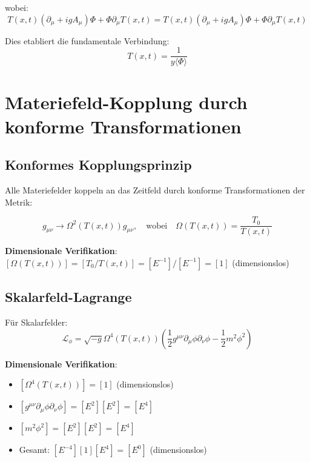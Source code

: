 \documentclass[12pt,a4paper]{article}
\newcommand{\Tfield}{T(x,t)}
\newcommand{\Tzero}{T_0}
\newcommand{\DhiggsT}{\Tfield (\partial_\mu + ig A_\mu) \Phi + \Phi \partial_\mu \Tfield}
\theoremstyle{definition}
\theoremstyle{remark}
\begin{document}
	wobei:
	\begin{equation}
		\DhiggsT = \Tfield (\partial_\mu + ig A_\mu) \Phi + \Phi \partial_\mu \Tfield
		\label{eq:higgs_verbindung}
	\end{equation}
	
	Dies etabliert die fundamentale Verbindung:
	\begin{equation}
		\Tfield = \frac{1}{y\langle\Phi\rangle}
		\label{eq:zeit_higgs_relation}
	\end{equation}
	
	\section{Materiefeld-Kopplung durch konforme Transformationen}
	\label{sec:materie_kopplung}
	
	\subsection{Konformes Kopplungsprinzip}
	\label{subsec:konformes_kopplungsprinzip}
	
	Alle Materiefelder koppeln an das Zeitfeld durch konforme Transformationen der Metrik:
	
	\begin{equation}
		g_{\mu\nu} \to \Omega^2(\Tfield) g_{\mu\nu}, \quad \text{wobei} \quad \Omega(\Tfield) = \frac{\Tzero}{\Tfield}
		\label{eq:konforme_transformation}
	\end{equation}
	
	\textbf{Dimensionale Verifikation}: $[\Omega(\Tfield)] = [\Tzero/\Tfield] = [E^{-1}]/[E^{-1}] = [1]$ (dimensionslos) \checkmark
	
	\subsection{Skalarfeld-Lagrange}
	\label{subsec:skalarfeld_lagrange}
	
	Für Skalarfelder:
	\begin{equation}
		\mathcal{L}_\phi = \sqrt{-g} \Omega^4(\Tfield) \left(\frac{1}{2} g^{\mu\nu} \partial_\mu \phi \partial_\nu \phi - \frac{1}{2} m^2 \phi^2\right)
		\label{eq:skalar_lagrange}
	\end{equation}
	
	\textbf{Dimensionale Verifikation}:
	\begin{itemize}
		\item $[\Omega^4(\Tfield)] = [1]$ (dimensionslos)
		\item $[g^{\mu\nu} \partial_\mu \phi \partial_\nu \phi] = [E^2][E^2] = [E^4]$
		\item $[m^2 \phi^2] = [E^2][E^2] = [E^4]$
		\item Gesamt: $[E^{-4}][1][E^4] = [E^0]$ (dimensionslos) \checkmark
	\end{itemize}
	
\end{document}
